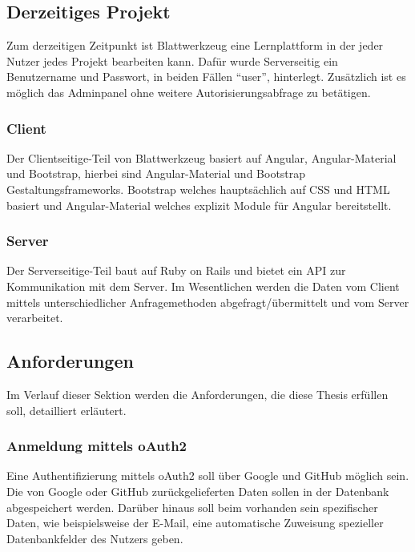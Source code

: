 \documentclass[11pt]{article}
\begin{document}
	\subsection{Derzeitiges Projekt}
	\label{sec: current_project}
	Zum derzeitigen Zeitpunkt ist Blattwerkzeug eine Lernplattform in der jeder Nutzer jedes Projekt bearbeiten kann. Dafür wurde Serverseitig ein Benutzername und Passwort, in beiden Fällen \enquote{user}, hinterlegt. Zusätzlich ist es möglich das Adminpanel ohne weitere Autorisierungsabfrage zu betätigen. 
	
	\subsubsection{Client}
	Der Clientseitige-Teil von Blattwerkzeug basiert auf Angular, Angular-Material und Bootstrap, hierbei sind Angular-Material und Bootstrap Gestaltungsframeworks. Bootstrap welches hauptsächlich auf \gls{CSS} und \gls{HTML} basiert und Angular-Material welches explizit Module für Angular bereitstellt. 
	
	\subsubsection{Server}
	Der Serverseitige-Teil baut auf Ruby on Rails und bietet ein \gls{API} zur Kommunikation mit dem Server. Im Wesentlichen werden die Daten vom Client mittels unterschiedlicher Anfragemethoden abgefragt/übermittelt und vom Server verarbeitet. 
	
	\subsection{Anforderungen}
	Im Verlauf dieser Sektion werden die Anforderungen, die diese Thesis erfüllen soll, detailliert erläutert.
		
	\subsubsection{Anmeldung mittels \gls{oAuth2}}
	Eine Authentifizierung mittels oAuth2 soll über Google und GitHub möglich sein. Die von Google oder GitHub zurückgelieferten Daten sollen in der Datenbank abgespeichert werden. Darüber hinaus soll beim vorhanden sein spezifischer Daten, wie beispielsweise der E-Mail, eine automatische Zuweisung spezieller Datenbankfelder des Nutzers geben.
	
\end{document}
